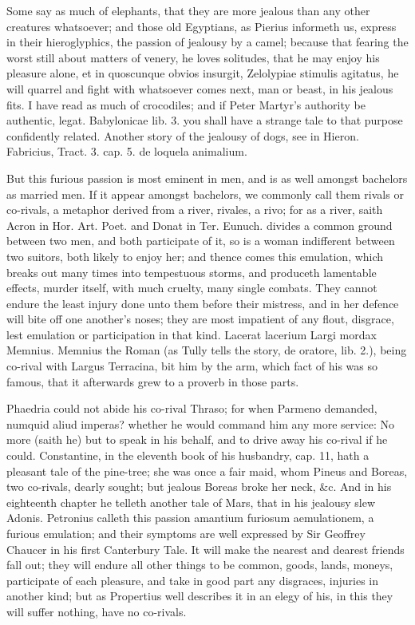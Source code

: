 {Some say as much of elephants, that they are more jealous than
any other creatures whatsoever; and those old Egyptians, as
Pierius informeth us, express in their hieroglyphics, the passion
of jealousy by a camel; because that fearing the worst still
about matters of venery, he loves solitudes, that he may enjoy his
pleasure alone, et in quoscunque obvios insurgit, Zelolypiae stimulis
agitatus, he will quarrel and fight with whatsoever comes next, man or
beast, in his jealous fits. I have read as much of crocodiles;
and if Peter Martyr's authority be authentic, legat. Babylonicae lib.
3. you shall have a strange tale to that purpose confidently related.
Another story of the jealousy of dogs, see in Hieron. Fabricius, Tract.
3. cap. 5. de loquela animalium.

But this furious passion is most eminent in men, and is as well amongst
bachelors as married men. If it appear amongst bachelors, we commonly
call them rivals or co-rivals, a metaphor derived from a river,
rivales, a rivo; for as a river, saith Acron in Hor. Art. Poet.
and Donat in Ter. Eunuch. divides a common ground between two men, and
both participate of it, so is a woman indifferent between two suitors,
both likely to enjoy her; and thence comes this emulation, which breaks
out many times into tempestuous storms, and produceth lamentable
effects, murder itself, with much cruelty, many single combats. They
cannot endure the least injury done unto them before their mistress,
and in her defence will bite off one another's noses; they are most
impatient of any flout, disgrace, lest emulation or participation in
that kind. Lacerat lacerium Largi mordax Memnius. Memnius the
Roman (as Tully tells the story, de oratore, lib. 2.), being co-rival
with Largus Terracina, bit him by the arm, which fact of his was so
famous, that it afterwards grew to a proverb in those parts.

Phaedria could not abide his co-rival Thraso; for when Parmeno
demanded, numquid aliud imperas? whether he would command him any more
service: No more (saith he) but to speak in his behalf, and to drive
away his co-rival if he could. Constantine, in the eleventh book of his
husbandry, cap. 11, hath a pleasant tale of the pine-tree; she
was once a fair maid, whom Pineus and Boreas, two co-rivals, dearly
sought; but jealous Boreas broke her neck, \&c. And in his eighteenth
chapter he telleth another tale of Mars, that in his jealousy
slew Adonis. Petronius calleth this passion amantium furiosum
aemulationem, a furious emulation; and their symptoms are well
expressed by Sir Geoffrey Chaucer in his first Canterbury Tale. It will
make the nearest and dearest friends fall out; they will endure all
other things to be common, goods, lands, moneys, participate of each
pleasure, and take in good part any disgraces, injuries in another
kind; but as Propertius well describes it in an elegy of his, in this
they will suffer nothing, have no co-rivals.

}
